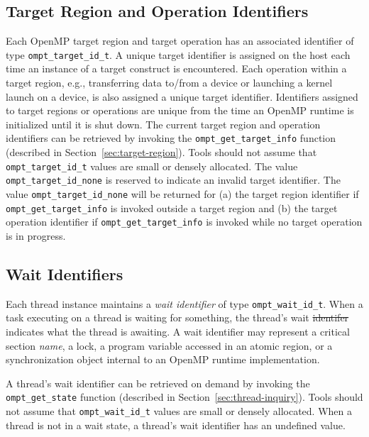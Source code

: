 \documentclass{article}
\providecommand{\DIFadd}[1]{{\protect\color{blue}\uwave{#1}}} %
\providecommand{\DIFdel}[1]{{\protect\color{red}\sout{#1}}}                      %
\providecommand{\DIFaddbegin}{} %
\providecommand{\DIFaddend}{} %
\providecommand{\DIFdelbegin}{} %
\providecommand{\DIFdelend}{} %
\begin{document}
\subsection{Target Region and Operation Identifiers}
Each OpenMP target region and target operation has an associated identifier of type \lstinline|ompt_target_id_t|. 
A unique target identifier is assigned on the host each time an instance of a target construct is encountered.
Each operation within a target region, e.g., transferring data to/from a device or launching a kernel launch 
on a device, is also assigned a unique target identifier. 
Identifiers assigned to target regions or operations 
are unique from the time an OpenMP runtime is initialized until it is shut down. 
The current target region and operation identifiers can be retrieved by invoking the \lstinline|ompt_get_target_info| function (described in Section~\ref{sec:target-region}).
Tools should not assume that \lstinline|ompt_target_id_t| values are small or densely allocated. 
The value \lstinline|ompt_target_id_none| is reserved to indicate an invalid target identifier. 
The value \lstinline|ompt_target_id_none| will be returned for (a) the target region identifier if \lstinline|ompt_get_target_info| is invoked outside a target region and (b) the target operation identifier if \lstinline|ompt_get_target_info| is invoked while no target operation is in progress.

\subsection{Wait Identifiers}
Each thread instance maintains a {\em wait identifier} of type \lstinline|ompt_wait_id_t|. 
When a task executing on a thread is waiting for something, the thread's wait \DIFdelbegin \DIFdel{identifer }\DIFdelend \DIFaddbegin \DIFadd{identifier }\DIFaddend indicates what the thread is awaiting. 
A wait identifier may represent a critical section {\em name}, a lock,  a program variable accessed in an atomic region, or a synchronization object internal to an OpenMP runtime implementation. 

A thread's wait identifier can be retrieved on demand by invoking the \lstinline|ompt_get_state| function (described in Section~\ref{sec:thread-inquiry}).
Tools should not assume that \lstinline|ompt_wait_id_t| values are small or densely allocated. 
When a thread is not in a wait state, a thread's wait identifier has an undefined value.
\end{document}
